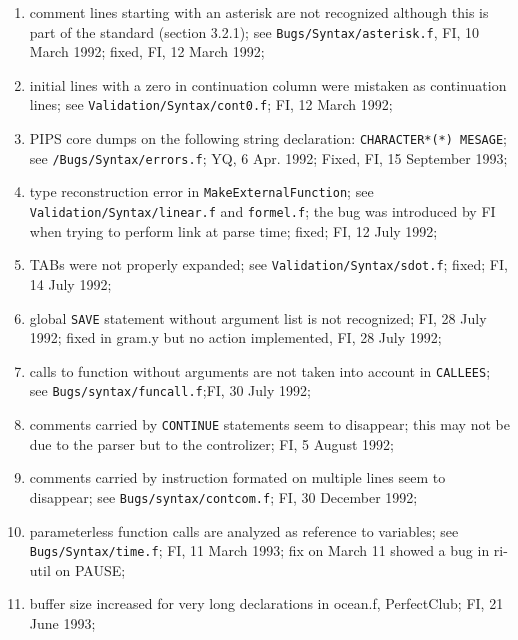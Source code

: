 \begin{enumerate}
  \item comment lines starting with an asterisk are not recognized
	although this is part of the standard (section 3.2.1);
	see \verb+Bugs/Syntax/asterisk.f+, FI, 10 March 1992;
	fixed, FI, 12 March 1992;

  \item initial lines with a zero in continuation column were mistaken
	as continuation lines; see \verb+Validation/Syntax/cont0.f+;
	FI, 12 March 1992;

  \item PIPS core dumps on the following string declaration:
	\verb+CHARACTER*(*) MESAGE+; see \verb+/Bugs/Syntax/errors.f+; YQ,
        6 Apr. 1992; Fixed, FI, 15 September 1993;

  \item type reconstruction error in \verb+MakeExternalFunction+; see
	\verb+Validation/Syntax/linear.f+ and \verb+formel.f+; the bug
	was introduced by FI when trying to perform link at parse time;
	fixed; FI, 12 July 1992;

  \item TABs were not properly expanded; see \verb+Validation/Syntax/sdot.f+;
	fixed; FI, 14 July 1992;

  \item global \verb+SAVE+ statement without argument list is not recognized;
	FI, 28 July 1992; fixed in gram.y but no action implemented, FI,
	28 July 1992;

  \item calls to function without arguments are not taken into account
	in \verb+CALLEES+; see \verb+Bugs/syntax/funcall.f+;FI, 30 July 1992;

  \item comments carried by \verb+CONTINUE+ statements seem to disappear;
	this may not be due to the parser but to the controlizer;
	FI, 5 August 1992;

  \item comments carried by instruction formated on multiple lines seem
	to disappear; see \verb+Bugs/syntax/contcom.f+; FI, 30 December 1992;

  \item parameterless function calls are analyzed as reference to
	variables; see \verb+Bugs/Syntax/time.f+; FI, 11 March 1993;
	fix on March 11 showed a bug in ri-util on PAUSE;

  \item buffer size increased for very long declarations in ocean.f,
	PerfectClub; FI, 21 June 1993;


\end{enumerate}
